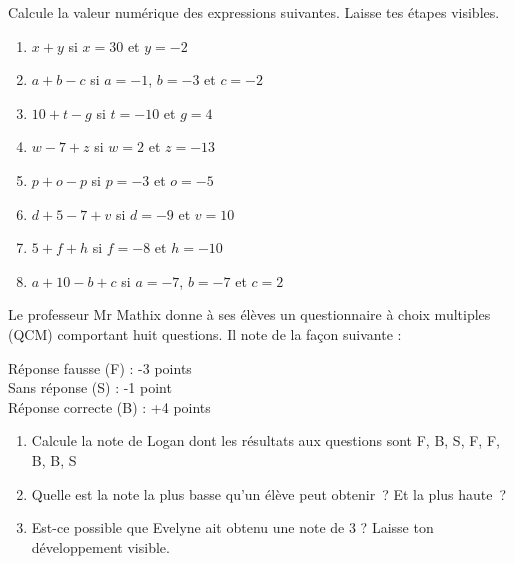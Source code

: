 \documentclass[../../syllabus_1.tex]{subfiles}
\begin{document}
\begin{exercise}
    Calcule la valeur numérique des expressions suivantes. Laisse tes étapes visibles.
    \begin{enumerate}[cols=2, itemsep=1em]
        \item $x + y$ si $x=30$ et $y=-2$
        \item $a + b - c$ si $a=-1$, $b = -3$ et $c = -2$
        \item $10 + t - g$ si $t = -10$ et $g=4$
        \item $w - 7 + z$ si $w = 2$ et $z = -13$
        \item $p + o - p$ si $p = -3$ et $o = -5$
        \item $d + 5 - 7 + v$ si $d = -9$ et $v = 10$
        \item $5 + f + h$ si $f = -8$ et $h = -10$
        \item $a + 10 - b + c $ si $a = -7$, $b = -7$ et $c=2$
    \end{enumerate}
\end{exercise}

\newpage
\begin{exercise}
    Le professeur Mr Mathix donne à ses élèves un questionnaire à choix multiples (QCM) comportant huit questions. Il note de la façon suivante :
    \begin{center}
        \begin{minipage}{7cm}
            Réponse fausse (F) : -3 points \\
            Sans réponse (S) : -1 point \\
            Réponse correcte (B) : +4 points
        \end{minipage}
    \end{center}
    \begin{enumerate}
        \item Calcule la note de Logan dont les résultats aux questions sont F, B, S, F, F, B, B, S
        \item Quelle est la note la plus basse qu'un élève peut obtenir~? Et la plus haute~?
        \item Est-ce possible que Evelyne ait obtenu une note de 3 ? Laisse ton développement visible.
    \end{enumerate}
\end{exercise}
\end{document}
